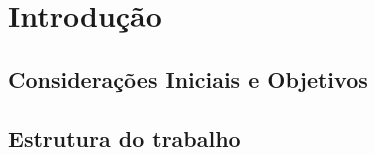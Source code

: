\chapter{Introdução}
	\section{Considerações Iniciais e Objetivos}
	\section{Estrutura do trabalho}
